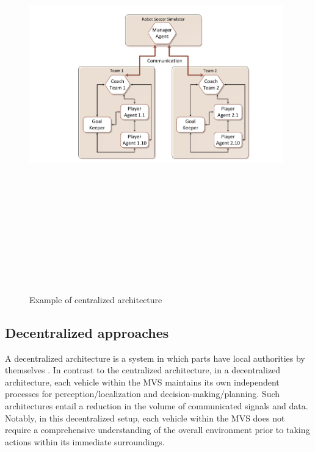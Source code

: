\begin{figure}[!h]
        \centering 
        \includegraphics[width=11cm,height=18cm,keepaspectratio]{chapters/Chapitre_3/Figures/CentralizedArchitecture}
        \caption{Example of centralized architecture \cite{ventura2015safe}\cite{camacho2006roboskeleton}}
        \label{fig:CentralizedArchitecture}
        \end{figure}

\subsection{Decentralized approaches}\label{sec:DecentralizedArchitecture}
A decentralized architecture is a system in which parts have local authorities by themselves \cite{assaad2019overview}. In contrast to the centralized architecture, in a decentralized architecture, each vehicle within the MVS maintains its own independent processes for perception/localization and decision-making/planning. Such architectures entail a reduction in the volume of communicated signals and data. Notably, in this decentralized setup, each vehicle within the MVS does not require a comprehensive understanding of the overall environment prior to taking actions within its immediate surroundings. 

